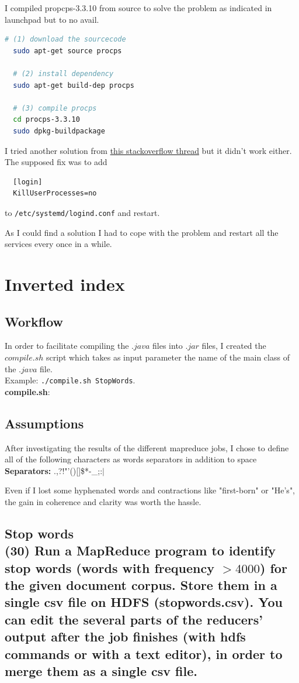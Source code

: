 \documentclass[a4paper,10pt]{article}
\begin{document}
I compiled propcps-3.3.10 from source to solve the problem as indicated in launchpad but to no avail.
\begin{lstlisting}[language=bash]
  # (1) download the sourcecode
  sudo apt-get source procps

  # (2) install dependency
  sudo apt-get build-dep procps

  # (3) compile procps
  cd procps-3.3.10
  sudo dpkg-buildpackage
\end{lstlisting}


I tried another solution from \href{http://stackoverflow.com/questions/38419078/logouts-while-running-hadoop-under-ubuntu-16-04}{this stackoverflow thread} but it didn't work either.
The supposed fix was to add
\begin{lstlisting}
  [login]
  KillUserProcesses=no
\end{lstlisting}
to \lstinline{/etc/systemd/logind.conf} and restart.

As I could find a solution I had to cope with the problem and restart all the
services every once in a while.

\section{Inverted index}
\subsection*{Workflow}
In order to facilitate compiling the $.java$ files into $.jar$ files, I created
the $compile.sh$ script which takes as input parameter the name of the main class of the $.java$ file.
\\Example: \lstinline{./compile.sh StopWords}.
\\ \textbf{compile.sh}:


\subsection*{Assumptions}
After investigating the results of the different mapreduce jobs, I chose to define
all of the following characters as words separators in addition to space
\\ \textbf{Separators:} .,?!"'()[]\$*-\_;:$|$

Even if I lost some hyphenated words and contractions like "first-born" or "He's", the gain in
coherence and clarity was worth the hassle.

\subsection{Stop words\\
(30) Run a MapReduce program to identify stop words (words with frequency $> 4000$)
for the given document corpus. Store them in a single csv file on HDFS
(stopwords.csv). You can edit the several parts of the reducers’ output after the job
finishes (with hdfs commands or with a text editor), in order to merge them as a single
csv file.}
\end{document}
